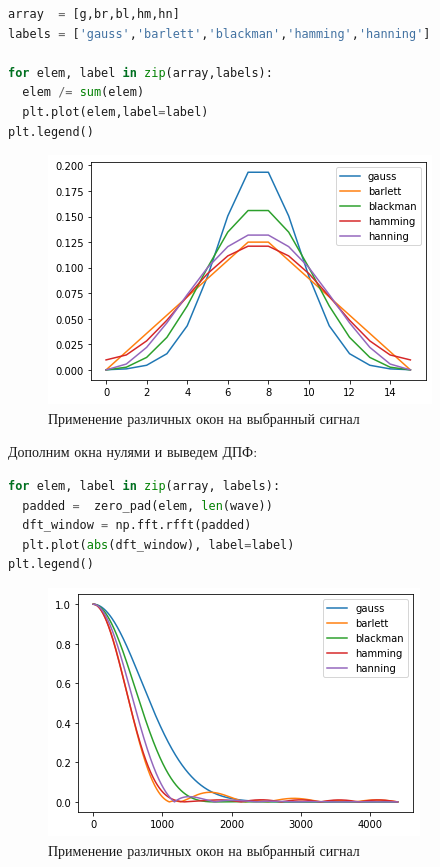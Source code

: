 \begin{lstlisting}[language=Python]
array  = [g,br,bl,hm,hn]
labels = ['gauss','barlett','blackman','hamming','hanning']

for elem, label in zip(array,labels):
  elem /= sum(elem)
  plt.plot(elem,label=label)
plt.legend()
\end{lstlisting}
\begin{figure}[H]
	\begin{center}
		\includegraphics[scale=1]{fig/lab08/lab08_21_1.png}
		\caption{Применение различных окон на выбранный сигнал}
	\end{center}
\end{figure}

Дополним окна нулями и выведем ДПФ:

\begin{lstlisting}[language=Python]
for elem, label in zip(array, labels):
  padded =  zero_pad(elem, len(wave))
  dft_window = np.fft.rfft(padded)
  plt.plot(abs(dft_window), label=label)
plt.legend()
\end{lstlisting}
\begin{figure}[H]
	\begin{center}
		\includegraphics[scale=1]{fig/lab08/lab08_23_1.png}
		\caption{Применение различных окон на выбранный сигнал}
	\end{center}
\end{figure}

